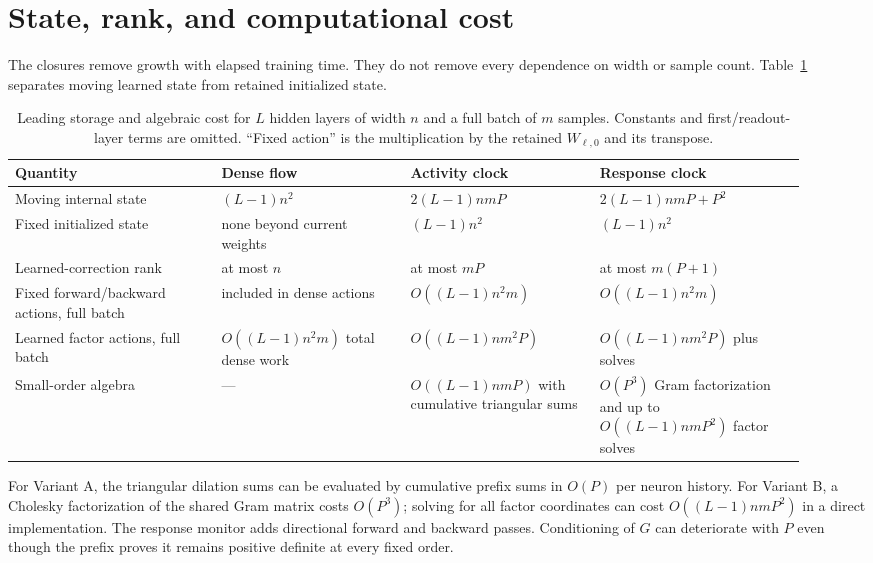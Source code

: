 \section{State, rank, and computational cost}
\label{sec:computation}

The closures remove growth with elapsed training time.  They do not remove
every dependence on width or sample count.  Table~\ref{tab:complexity}
separates moving learned state from retained initialized state.

\begin{table}[t]
\centering
\small
\caption{Leading storage and algebraic cost for $L$ hidden layers of width
$n$ and a full batch of $m$ samples.  Constants and first/readout-layer terms
are omitted.  ``Fixed action'' is the multiplication by the retained
$W_{\ell,0}$ and its transpose.}
\label{tab:complexity}
\begin{tabular}{@{}p{0.24\linewidth}p{0.22\linewidth}p{0.22\linewidth}p{0.24\linewidth}@{}}
\toprule
Quantity & Dense flow & Activity clock & Response clock\\
\midrule
Moving internal state
& $(L-1)n^2$
& $2(L-1)nmP$
& $2(L-1)nmP+P^2$\\
Fixed initialized state
& none beyond current weights
& $(L-1)n^2$
& $(L-1)n^2$\\
Learned-correction rank
& at most $n$
& at most $mP$
& at most $m(P+1)$\\
Fixed forward/backward actions, full batch
& included in dense actions
& $O((L-1)n^2m)$
& $O((L-1)n^2m)$\\
Learned factor actions, full batch
& $O((L-1)n^2m)$ total dense work
& $O((L-1)nm^2P)$
& $O((L-1)nm^2P)$ plus solves\\
Small-order algebra
& ---
& $O((L-1)nmP)$ with cumulative triangular sums
& $O(P^3)$ Gram factorization and up to $O((L-1)nmP^2)$ factor solves\\
\bottomrule
\end{tabular}
\end{table}

For Variant A, the triangular dilation sums can be evaluated by cumulative
prefix sums in $O(P)$ per neuron history.  For Variant B, a Cholesky
factorization of the shared Gram matrix costs $O(P^3)$; solving for all factor
coordinates can cost $O((L-1)nmP^2)$ in a direct implementation.  The response
monitor adds directional forward and backward passes.  Conditioning of $G$ can
deteriorate with $P$ even though the prefix proves it remains positive
definite at every fixed order.

